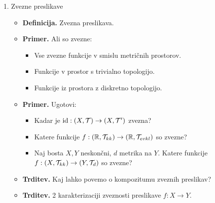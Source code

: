 \begin{enumerate}
    \item Zvezne preslikave
    \begin{itemize}
        \item \textbf{Definicija.} Zvezna preslikava.
        \item \textbf{Primer.} Ali so zvezne:
        \begin{itemize}
            \item Vse zvezne funkcije v smislu metričnih prostorov.
            \item Funkcije v prostor s trivialno topologijo.
            \item Funkcije iz prostora z diskretno topologijo.          
        \end{itemize}
        \item \textbf{Primer.} Ugotovi:
        \begin{itemize}
            \item Kadar je $\operatorname{id}: (X, \mathcal{T}) \to (X, \mathcal{T}')$ zvezna?
            \item Katere funkcije $f: (\mathbb{R}, \mathcal{T}_{kk}) \to (\mathbb{R}, \mathcal{T}_{evkl})$ so zvezne?
            \item Naj bosta $X, Y$ neskončni, $d$ metrika na $Y$. Katere funkcije $f: (X, \mathcal{T}_{kk}) \to (Y, \mathcal{T}_{d})$ so zvezne?
        \end{itemize}
        \item \textbf{Trditev.} Kaj lahko povemo o kompozitumu zveznih preslikav?
        \item \textbf{Trditev.} 2 karakterizaciji zveznosti preslikave $f: X \to Y$.
    \end{itemize}
\end{enumerate}

\newpage
